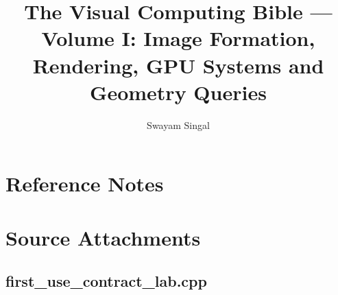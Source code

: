 \documentclass[11pt,twoside]{book}
\title{The Visual Computing Bible --- Volume I: Image Formation, Rendering, GPU Systems and Geometry Queries}
\author{Swayam Singal}
\begin{document}
\maketitle
\hypertarget{volume-reading-map}{}
\tableofcontents
\mainmatter





















\appendix
\chapter{Reference Notes}


























\chapter{Source Attachments}
\hypertarget{source-file-a41016f2e326b40cdff18ff4}{}
\section*{first\_use\_contract\_lab.cpp}
\end{document}
